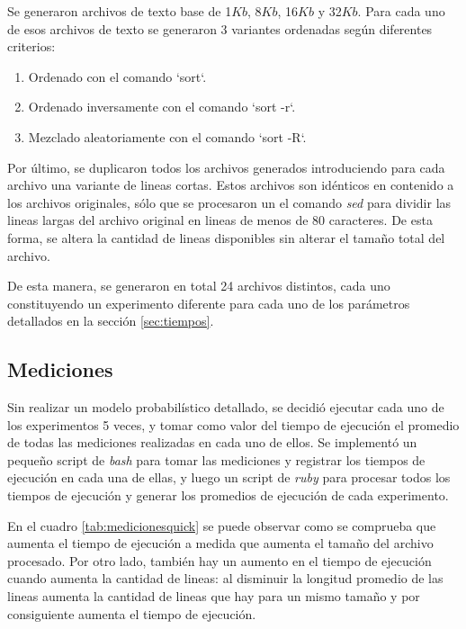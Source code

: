 \documentclass[a4paper,11pt]{article}
\begin{document}
Se generaron archivos de texto base de 1\(Kb\), 8\(Kb\), 16\(Kb\) y
32\(Kb\). Para cada uno de esos archivos de texto se generaron 3 variantes
ordenadas según diferentes criterios:

\begin{enumerate}
  \item Ordenado con el comando `sort`.
  \item Ordenado inversamente con el comando `sort -r`.
  \item Mezclado aleatoriamente con el comando `sort -R`.
\end{enumerate}

Por último, se duplicaron todos los archivos generados introduciendo para cada
archivo una variante de lineas cortas. Estos archivos son idénticos en
contenido a los archivos originales, sólo que se procesaron un el comando
\textit{sed} \cite{WIKISED} para dividir las lineas largas del archivo original
en lineas de menos de 80 caracteres. De esta forma, se altera la cantidad de
lineas disponibles sin alterar el tamaño total del archivo.

De esta manera, se generaron en total 24 archivos distintos, cada uno
constituyendo un experimento diferente para cada uno de los parámetros
detallados en la sección \ref{sec:tiempos}.

\subsection{Mediciones}

Sin realizar un modelo probabilístico detallado, se decidió ejecutar cada uno
de los experimentos 5 veces, y tomar como valor del tiempo de ejecución el
promedio de todas las mediciones realizadas en cada uno de ellos. Se implementó
un pequeño script de \textit{bash} \cite{WIKIBASH} para tomar las mediciones y
registrar los tiempos de ejecución en cada una de ellas, y luego un script de
\textit{ruby} \cite{WIKIRUBY} para procesar todos los tiempos de ejecución y
generar los promedios de ejecución de cada experimento.

En el cuadro \ref{tab:medicionesquick} se puede observar como se comprueba que
aumenta el tiempo de ejecución a medida que aumenta el tamaño del archivo
procesado. Por otro lado, también hay un aumento en el tiempo de ejecución
cuando aumenta la cantidad de lineas: al disminuir la longitud promedio de las
lineas aumenta la cantidad de lineas que hay para un mismo tamaño y por
consiguiente aumenta el tiempo de ejecución.
\end{document}
